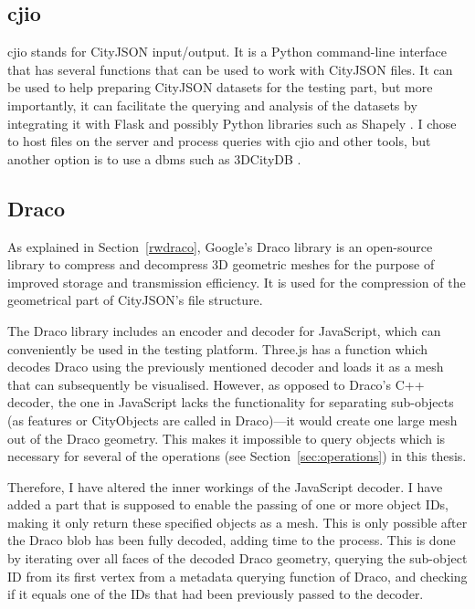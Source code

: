 \subsection{cjio}
cjio \citep{cjio} stands for CityJSON input/output.
It is a Python command-line interface that has several functions that can be used to work with CityJSON files.
It can be used to help preparing CityJSON datasets for the testing part, but more importantly, it can facilitate the querying and analysis of the datasets by integrating it with Flask and possibly Python libraries such as Shapely \citep{cjio}.
I chose to host files on the server and process queries with cjio and other tools, but another option is to use a \ac{dbms} such as 3DCityDB \citep{TUM2020}.


\subsection{Draco}
\label{sec:dracoimplementation}
As explained in Section~\ref{rwdraco}, Google's Draco library is an open-source library to compress and decompress 3D geometric meshes for the purpose of improved storage and transmission efficiency.
It is used for the compression of the geometrical part of CityJSON's file structure\citep{draco}.

The Draco library includes an encoder and decoder for JavaScript, which can conveniently be used in the testing platform.
Three.js has a function which decodes Draco using the previously mentioned decoder and loads it as a mesh that can subsequently be visualised.
However, as opposed to Draco's C++ decoder, the one in JavaScript lacks the functionality for separating sub-objects (as features or CityObjects are called in Draco)---it would create one large mesh out of the Draco geometry.
This makes it impossible to query objects which is necessary for several of the operations (see Section~\ref{sec:operations}) in this thesis.

Therefore, I have altered the inner workings of the JavaScript decoder.
I have added a part that is supposed to enable the passing of one or more object IDs, making it only return these specified objects as a mesh.
This is only possible after the Draco blob has been fully decoded, adding time to the process.
This is done by iterating over all faces of the decoded Draco geometry, querying the sub-object ID from its first vertex from a metadata querying function of Draco, and checking if it equals one of the IDs that had been previously passed to the decoder.

